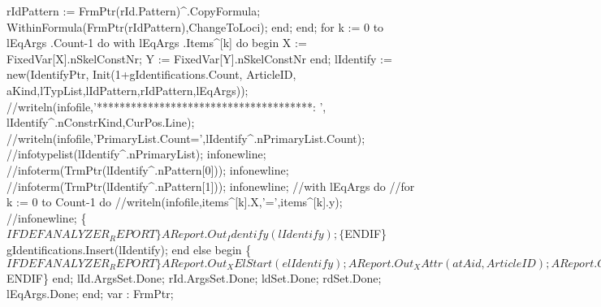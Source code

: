                rIdPattern := FrmPtr(rId.Pattern)^.CopyFormula;
               WithinFormula(FrmPtr(rIdPattern),ChangeToLoci);
            end;
      end;
      for k := 0 to lEqArgs .Count-1 do  with lEqArgs .Items^[k] do
      begin X := FixedVar[X].nSkelConstNr; Y := FixedVar[Y].nSkelConstNr end;
      lIdentify := new(IdentifyPtr,
                       Init(1+gIdentifications.Count, ArticleID,
                        aKind,lTypList,lIdPattern,rIdPattern,lEqArgs));
//writeln(infofile,'**************************************: ', lIdentify^.nConstrKind,CurPos.Line);
//writeln(infofile,'PrimaryList.Count=',lIdentify^.nPrimaryList.Count);
//infotypelist(lIdentify^.nPrimaryList); infonewline;
//infoterm(TrmPtr(lIdentify^.nPattern[0])); infonewline;
//infoterm(TrmPtr(lIdentify^.nPattern[1])); infonewline;
//with lEqArgs do
//for k := 0 to Count-1 do
//writeln(infofile,items^[k].X,'=',items^[k].y);
//infonewline;
      \{$IFDEF ANALYZER_REPORT\}
      AReport.Out_Identify(lIdentify);
      \{$ENDIF\}
      gIdentifications.Insert(lIdentify);
   end
   else
   begin
      \{$IFDEF ANALYZER_REPORT\}
      AReport.Out_XElStart(elIdentify);
      AReport.Out_XAttr(atAid, ArticleID);
      AReport.Out_XIntAttr(atNr, 0);
      AReport.Out_XAttr(atConstrKind, aKind);
      AReport.Out_XAttrEnd;
      AReport.Out_XEl1(elErrorIdentify);
      AReport.Out_XElEnd(elIdentify);
      \{$ENDIF\}
   end;
   lId.ArgsSet.Done; rId.ArgsSet.Done;
   ldSet.Done; rdSet.Done;
   lEqArgs.Done;
end;
\eatline
{}\nwendcode{}\nwdocspar
\nwenddocs{}\endmoddef\nwstartdeflinemarkup{}\nwenddeflinemarkup
var : FrmPtr;


